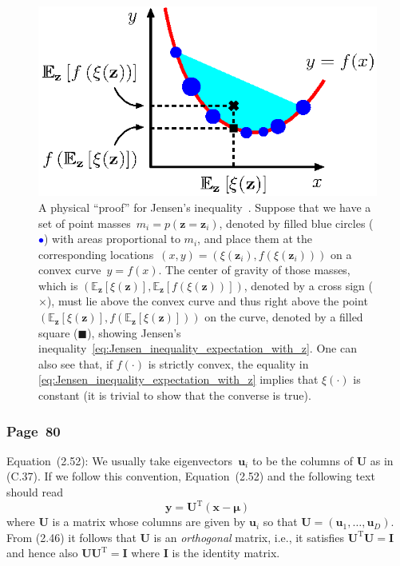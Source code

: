 \documentclass[12pt,a4paper]{article}
\newcommand{\erratum}[1]{\subsubsection*{#1}}
\begin{document}
\begin{figure}
\centering
\includegraphics{jensen_inequality.eps}
\caption{A physical ``proof'' for
Jensen's inequality~\citep{MacKay:Information}.
Suppose that we have a set of point masses~$m_i = p(\mathbf{z}=\mathbf{z}_i)$,
denoted by filled blue circles ({\large\textcolor{blue}{$\bullet$}})
with areas proportional to $m_i$,
and place them at the corresponding
locations~$(x, y) = \left(\xi(\mathbf{z}_i), f(\xi(\mathbf{z}_i))\right)$
on a convex curve~$y = f(x)$.
The center of gravity of those masses, which is $\left(
\mathbb{E}_{\mathbf{z}}\left[\xi(\mathbf{z})\right],
\mathbb{E}_{\mathbf{z}}\left[f\left(\xi(\mathbf{z})\right)\right]
\right)$, denoted by a cross sign ($\boldsymbol{\times}$),
must lie above the convex curve and thus right above the point~$\left(
\mathbb{E}_{\mathbf{z}}\left[\xi(\mathbf{z})\right],
f\left(\mathbb{E}_{\mathbf{z}}\left[\xi(\mathbf{z})\right]\right)
\right)$ on the curve, denoted by a filled square ($\blacksquare$),
showing Jensen's inequality~\eqref{eq:Jensen_inequality_expectation_with_z}.
One can also see that, if $f(\cdot)$ is strictly convex,
the equality in \eqref{eq:Jensen_inequality_expectation_with_z}
implies that $\xi(\cdot)$ is constant (it is trivial to show that the converse is true). }
\label{fig:Jensen_inequality}
\end{figure}

\erratum{Page~80}
Equation~(2.52):
We usually take eigenvectors~$\mathbf{u}_{i}$ to be the columns of $\mathbf{U}$ as in (C.37).
If we follow this convention, Equation~(2.52) and the following text should read
\begin{equation}
\mathbf{y} = \mathbf{U}^{\operatorname{T}} (\mathbf{x} - \bm{\mu})
\label{eq:change_of_variable_x_to_y}
\end{equation}
where $\mathbf{U}$ is a matrix whose columns are given by $\mathbf{u}_{i}$ so that
$\mathbf{U} = \left( \mathbf{u}_{1}, \dots,  \mathbf{u}_{D}\right)$.
From (2.46) it follows that $\mathbf{U}$ is an \emph{orthogonal} matrix, i.e.,
it satisfies $\mathbf{U}^{\operatorname{T}}\mathbf{U} = \mathbf{I}$ and hence also
$\mathbf{U}\mathbf{U}^{\operatorname{T}} = \mathbf{I}$ where $\mathbf{I}$ is the identity matrix.
\end{document}
